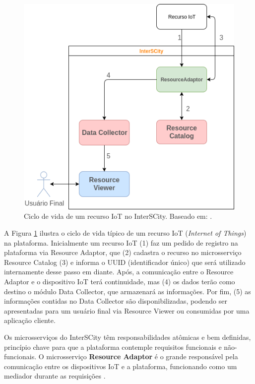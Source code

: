 \begin{figure}
  \centering
    \includegraphics[scale=0.5]{figuras/interscity_flow.png}
  \caption{Ciclo de vida de um recurso IoT no InterSCity. Baseado em: .}

  \label{fig:interscity-lifecycle}
\end{figure}

A Figura \ref{fig:interscity-lifecycle} ilustra o ciclo de vida típico de um
recurso IoT (\textit{Internet of Things}) na plataforma. Inicialmente um recurso IoT (1) faz um pedido de
registro na plataforma via Resource Adaptor, que (2) cadastra o recurso no
microsserviço Resource Catalog (3) e informa o UUID
(identificador único) que será utilizado internamente desse passo em diante.
Após, a comunicação entre o Resource Adaptor e o dispositivo IoT terá
continuidade, mas (4) os dados terão como destino o módulo Data Collector,
que armazenará as informações. Por fim, (5) as informações contidas no
Data Collector são disponibilizadas, podendo ser apresentadas para um usuário
final via Resource Viewer ou consumidas por uma aplicação cliente.

Os microsserviços do InterSCity têm responsabilidades atômicas e bem
definidas, princípio chave para que a plataforma contemple requisitos funcionais
e não-funcionais. O microsserviço \textbf{Resource Adaptor} é o grande
responsável pela comunicação entre os dispositivos IoT e a plataforma,
funcionando como um mediador durante as requisições \cite{delesposte2017}.

